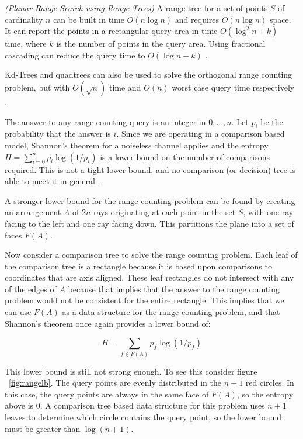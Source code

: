 \documentclass[mcs]{scsthesis}
\begin{document}
\begin{thm} \emph{(Planar Range Search using Range Trees)} 
A range tree for a set of points \(S\) of cardinality \(n\) can be built in
time \(O(n \log n)\) and requires \(O(n \log n)\) space. It can report the
points in a rectangular query area in time \(O(\log^2 n + k)\) time, where
\(k\) is the number of points in the query area. Using fractional cascading can
reduce the query time to \(O(\log n + k)\) \cite{dutch}. 
\end{thm}

Kd-Trees and quadtrees can also be used to solve the orthogonal range counting
problem, but with \(O(\sqrt n)\) time and \(O(n)\) worst case query time
respectively \cite{dutch}.

The answer to any range counting query is an integer in \({0, ..., n}\). Let
\(p_i\) be the probability that the answer is \(i\). Since we are operating in a
comparison based model, Shannon's theorem for a noiseless channel applies and
the entropy \(H=\sum_{i=0}^n{p_i\log(1/p_i)}\) is a lower-bound on the number of
comparisons required. This is not a tight lower bound, and no comparison (or
decision) tree is able to meet it in general \cite{biasedrange}.

A stronger lower bound for the range counting problem can be found by creating
an arrangement \(A\) of \(2n\) rays originating at each point in the set \(S\),
with one ray facing to the left and one ray facing down. This partitions the
plane into a set of faces \(F(A)\).

Now consider a comparison tree to solve the range counting problem. Each leaf of
the comparison tree is a rectangle because it is based upon comparisons to
coordinates that are axis aligned.  These leaf rectangles do not intersect with
any of the edges of \(A\) because that implies that the answer to the range
counting problem would not be consistent for the entire rectangle. This implies
that we can use \(F(A)\) as a data structure for the range counting problem,
and that Shannon's theorem once again provides a lower bound of:

$$
H=\sum_{f \in F(A)}{p_f\log(1/p_f)}
$$

This lower bound is still not strong enough. To see this consider figure
~\ref{fig:rangelb}. The query points are evenly distributed in the \(n + 1\)
red circles. In this case, the query points are always in the same face of
\(F(A)\), so the entropy above is 0. A comparison tree based data structure
for this problem uses \(n + 1\) leaves to determine which circle contains
the query point, so the lower bound must be greater than \(\log(n + 1)\).
\end{document}
